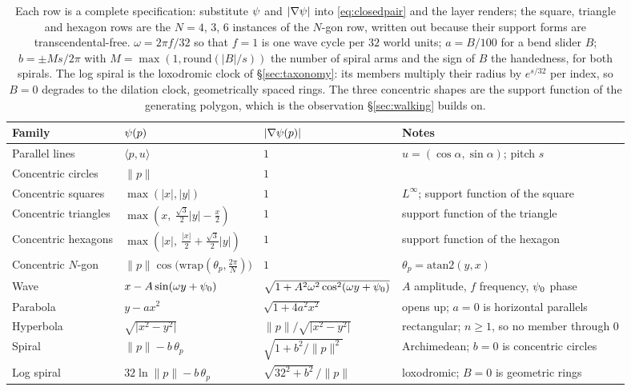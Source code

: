 \begin{table}[t]
  \centering
  \caption{ Each row is a complete
  specification: substitute $\psi$ and $\lvert\nabla\psi\rvert$ into
  \eqref{eq:closedpair} and the layer renders; the square, triangle and
  hexagon rows are the $N=4$, $3$, $6$ instances of the $N$-gon row, written
  out because their support forms are transcendental-free. $\omega=2\pi f/32$ so that
  $f=1$ is one wave cycle per $32$ world units; $a=B/100$ for a bend slider $B$;
  $b=\pm Ms/2\pi$ with $M=\max(1,\mathrm{round}(\lvert B\rvert/s))$ the number
  of spiral arms and the sign of $B$ the handedness, for both spirals. The log
  spiral is the loxodromic clock of \S\ref{sec:taxonomy}: its members multiply
  their radius by $e^{s/32}$ per index, so $B=0$ degrades to the dilation
  clock, geometrically spaced rings. The three concentric shapes are the
  support function of the
  generating polygon, which is the observation \S\ref{sec:walking} builds on.}
  \label{tab:catalog}
  \small
  \begin{tabular}{@{}llll@{}}
    \toprule
    Family & $\psi(p)$ & $\lvert\nabla\psi(p)\rvert$ & Notes \\
    \midrule
    Parallel lines
      & $\langle p,u\rangle$
      & $1$
      & $u=(\cos\alpha,\sin\alpha)$; pitch $s$ \\
    Concentric circles
      & $\lVert p\rVert$
      & $1$
      & \\
    Concentric squares
      & $\max(\lvert x\rvert,\lvert y\rvert)$
      & $1$
      & $L^\infty$; support function of the square \\
    Concentric triangles
      & $\max\!\left(x,\ \tfrac{\sqrt3}{2}\lvert y\rvert-\tfrac{x}{2}\right)$
      & $1$
      & support function of the triangle \\
    Concentric hexagons
      & $\max\!\left(\lvert x\rvert,\ \tfrac{\lvert x\rvert}{2}+\tfrac{\sqrt3}{2}\lvert y\rvert\right)$
      & $1$
      & support function of the hexagon \\
    Concentric $N$-gon
      & $\lVert p\rVert\cos\!\big(\mathrm{wrap}(\theta_p,\tfrac{2\pi}{N})\big)$
      & $1$
      & $\theta_p=\mathrm{atan2}(y,x)$ \\
    Wave
      & $x-A\sin(\omega y+\psi_0)$
      & $\sqrt{1+A^2\omega^2\cos^2(\omega y+\psi_0)}$
      & $A$ amplitude, $f$ frequency, $\psi_0$ phase \\
    Parabola
      & $y-a x^2$
      & $\sqrt{1+4a^2x^2}$
      & opens up; $a=0$ is horizontal parallels \\
    Hyperbola
      & $\sqrt{\lvert x^2-y^2\rvert}$
      & $\lVert p\rVert/\sqrt{\lvert x^2-y^2\rvert}$
      & rectangular; $n\ge1$, so no member through $0$ \\
    Spiral
      & $\lVert p\rVert-b\,\theta_p$
      & $\sqrt{1+b^2/\lVert p\rVert^2}$
      & Archimedean; $b=0$ is concentric circles \\
    Log spiral
      & $32\ln\lVert p\rVert-b\,\theta_p$
      & $\sqrt{32^2+b^2}\,/\lVert p\rVert$
      & loxodromic; $B=0$ is geometric rings \\
    \bottomrule
  \end{tabular}
\end{table}


